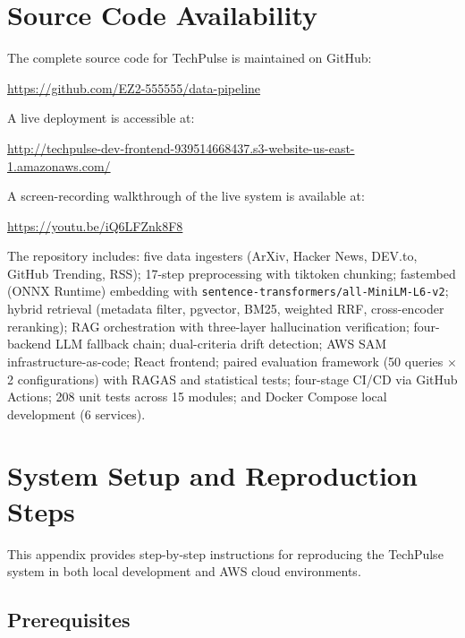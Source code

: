 \appendix

\chapter{Source Code Availability}

The complete source code for TechPulse is maintained on GitHub:

\begin{center}
\url{https://github.com/EZ2-555555/data-pipeline}
\end{center}

\noindent A live deployment is accessible at:

\begin{center}
\url{http://techpulse-dev-frontend-939514668437.s3-website-us-east-1.amazonaws.com/}
\end{center}

\noindent A screen-recording walkthrough of the live system is available at:

\begin{center}
\url{https://youtu.be/iQ6LFZnk8F8}
\end{center}

The repository includes: five data ingesters (ArXiv, Hacker News, DEV.to, GitHub Trending, RSS); 17-step preprocessing with tiktoken chunking; fastembed (ONNX Runtime) embedding with \texttt{sentence-transformers/all-MiniLM-L6-v2}; hybrid retrieval (metadata filter, pgvector, BM25, weighted RRF, cross-encoder reranking); RAG orchestration with three-layer hallucination verification; four-backend LLM fallback chain; dual-criteria drift detection; AWS SAM infrastructure-as-code; React frontend; paired evaluation framework (50 queries $\times$ 2 configurations) with RAGAS and statistical tests; four-stage CI/CD via GitHub Actions; 208 unit tests across 15 modules; and Docker Compose local development (6 services).

\chapter{System Setup and Reproduction Steps}
\label{app:setup}

This appendix provides step-by-step instructions for reproducing the TechPulse system in both local development and AWS cloud environments.

\section*{Prerequisites}

